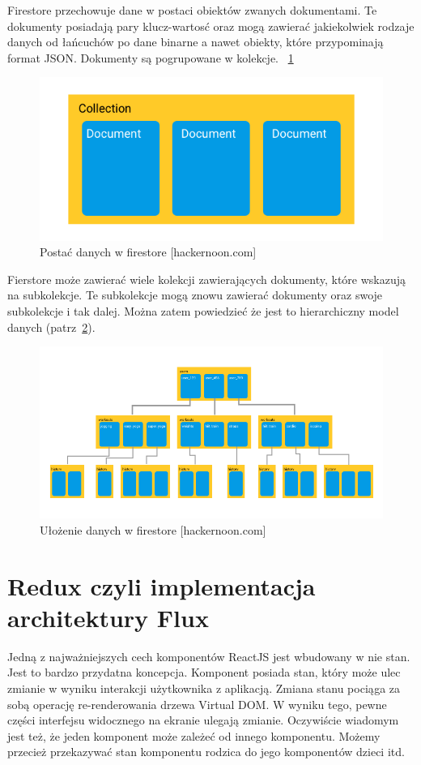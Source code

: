 Firestore przechowuje dane w postaci obiektów zwanych dokumentami.
Te dokumenty posiadają pary klucz-wartosć oraz mogą zawierać jakiekolwiek rodzaje danych
od łańcuchów po dane binarne a nawet obiekty, które przypominają format JSON\@.
Dokumenty są pogrupowane w kolekcje.
~\ref{rys:firestoreData}

\begin{figure}
	\centering\includegraphics[width=.6\textwidth]{img/firestoreData}
	\caption{Postać danych w firestore [hackernoon.com]}\label{rys:firestoreData}%
\end{figure}

Fierstore może zawierać wiele kolekcji zawierających dokumenty, które wskazują na subkolekcje.
Te subkolekcje mogą znowu zawierać dokumenty oraz swoje subkolekcje i tak dalej.
Można zatem powiedzieć że jest to hierarchiczny model danych (patrz~\ref{rys:firestoreTree}).
~\cite{www_hakermoon}

\begin{figure}
	\centering\includegraphics[width=.6\textwidth]{img/firestoreTree}
	\caption{Ułożenie danych w firestore [hackernoon.com]}\label{rys:firestoreTree}%
\end{figure}

\section{Redux czyli implementacja architektury Flux}

Jedną z najważniejszych cech komponentów ReactJS jest wbudowany w nie stan.
Jest to bardzo przydatna koncepcja. Komponent posiada stan,
który może ulec zmianie w wyniku interakcji użytkownika z aplikacją.
Zmiana stanu pociąga za sobą operację re-renderowania drzewa Virtual DOM\@.
W wyniku tego, pewne części interfejsu widocznego na ekranie ulegają zmianie.
Oczywiście wiadomym jest też, że jeden komponent może zależeć od innego komponentu.
Możemy przecież przekazywać stan komponentu rodzica do jego komponentów dzieci itd.

